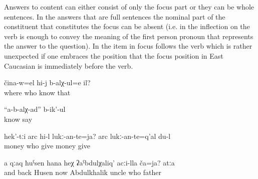 Answers to content  can either consist of only the focus part  or they can be whole sentences. In the answers that are full sentences the nominal part of the constituent that constitutes the focus can be absent (i.e. in  the inflection on the verb is enough to convey the meaning of the first person pronoun that represents the answer to the question). In  the item in focus follows the verb which is rather unexpected if one embraces the position that the focus position in East Caucasian is immediately before the verb.

\begin{exe}
	\ex	\label{ex:‎‎‎Who knows where he is}
	\gll	čina-w=el	hi-j	b-alχ-ul=e	il?\\
		where	who	know	that\\
	\glt	{}

	\ex	\label{ex:‎‎We do not know, they say}
	\gll	``a-b-alχ-ad''	b-ik'-ul\\
		know	say\\
	\glt	{}

	\ex	\label{ex:‎‎‎Who should give this money (back)? ‎‎I have to give the money back}
	\gll	hek'-tːi	arc	hi-l	lukː-an-te=ja?		arc	lukː-an-te=q'al	du-l\\
			money	who	give	money	give	\\
	\glt	{}

	\ex	\label{ex:‎And Kak Husen, who is he with respect to uncle Abdukhalik? The Father}
	\gll	a	qːaq	ħuˁsen	hana	heχ	ʡaˁbdulχaliq'	acːi-lla	ča=ja? 		atːa\\
		and	back	Husen	now		Abdulkhalik	uncle	who	 father\\
	\glt	{}
\end{exe}




